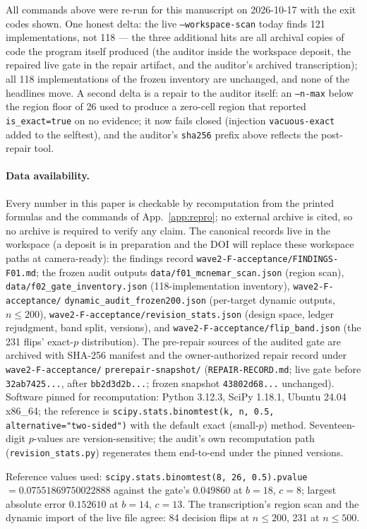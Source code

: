 \documentclass[10pt]{article}
\newcommand{\code}[1]{\texttt{#1}}
\begin{document}
All commands above were re-run for this manuscript on 2026-10-17 with the
exit codes shown. One honest delta: the live \code{--workspace-scan} today
finds 121 implementations, not 118 --- the three additional hits are all
archival copies of code the program itself produced (the auditor inside
the workspace deposit, the repaired live gate in the repair artifact, and the
auditor's archived transcription); all 118 implementations of the frozen
inventory are unchanged, and none of the headlines move. A second delta
is a repair to the auditor itself: an \code{--n-max} below the region
floor of 26 used to produce a zero-cell region that reported
\code{is\_exact=true} on no evidence; it now fails closed (injection
\code{vacuous-exact} added to the selftest), and the auditor's
\code{sha256} prefix above reflects the post-repair tool.

\paragraph{Data availability.} Every number in this paper is checkable by
recomputation from the printed formulas and the commands of
App.~\ref{app:repro}; no external archive is cited, so no archive is required
to verify any claim. The canonical records live in the workspace
(a deposit is in preparation and the DOI will replace these workspace paths at
camera-ready): the findings record
\code{wave2-F-acceptance/FINDINGS-F01.md}; the frozen audit outputs
\code{data/f01\_mcnemar\_scan.json} (region scan),
\code{data/f02\_gate\_inventory.json} (118-implementation inventory),
\code{wave2-F-acceptance/}
\code{dynamic\_audit\_frozen200.json} (per-target dynamic
outputs, $n\le200$), \code{wave2-F-acceptance/revision\_stats.json} (design
space, ledger rejudgment, band split, versions), and
\code{wave2-F-acceptance/flip\_band.json} (the 231 flips' exact-$p$
distribution). The pre-repair sources of the audited gate are archived with
SHA-256 manifest and the owner-authorized repair record under
\code{wave2-F-acceptance/} \code{prerepair-\allowbreak snapshot/}
(\code{REPAIR-\allowbreak RECORD.md}; live gate before \code{32ab7425...},
after \code{bb2d3d2b...}; frozen snapshot \code{43802d68...} unchanged). Software pinned for recomputation: Python 3.12.3, SciPy
1.18.1, Ubuntu 24.04 x86\_64; the reference is
\code{scipy.stats.binomtest(k, n, 0.5, alternative="two-sided")} with the
default exact (small-$p$) method. Seventeen-digit $p$-values are
version-sensitive; the audit's own recomputation path
(\code{revision\_stats.py}) regenerates them end-to-end under the pinned
versions.

Reference values used: \code{scipy.stats.binomtest(8, 26, 0.5).pvalue}
$= 0.07551869750022888$ against the gate's $0.049860$ at $b{=}18$, $c{=}8$;
largest absolute error $0.152610$ at $b{=}14$, $c{=}13$. The transcription's
region scan and the dynamic import of the live file agree: 84 decision flips
at $n\le200$, 231 at $n\le500$.
\end{document}
